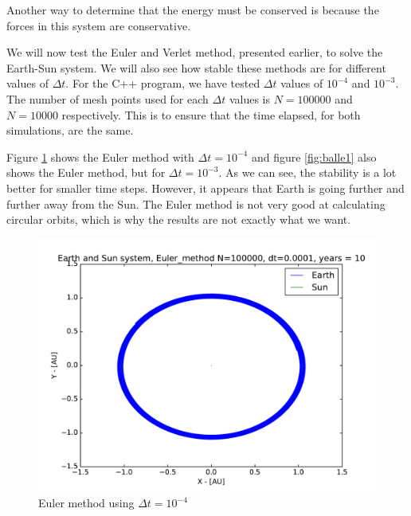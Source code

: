\documentclass[12pt]{article}
\begin{document}
Another way to determine that the energy must be conserved is because the forces in this system are conservative.


We will now test the Euler and Verlet method, presented earlier, to solve the Earth-Sun system. We will also see how stable these methods are for different values of $\Delta t$. For the C++ program, we have tested $\Delta t$ values of $10^{-4}$ and $10^{-3}$. The number of mesh points used for each $\Delta t$ values is $N = 100 000$ and $N=10 000$ respectively. This is to ensure that the time elapsed, for both simulations, are the same.

Figure \ref{fig:balle} shows the Euler method with $\Delta t = 10^{-4}$ and figure \ref{fig:balle1} also shows the Euler method, but for $\Delta t = 10^{-3}$. As we can see, the stability is a lot better for smaller time steps. However, it appears that Earth is going further and further away from the Sun. The Euler method is not very good at calculating circular orbits, which is why the results are not exactly what we want.

\begin{figure}[!h]
\centering
\includegraphics[width=\linewidth]{Plots/Earth_Sun_Euler_method.pdf}
\caption{Euler method using $\Delta t = 10^{-4}$}
\label{fig:balle}
\end{figure}
\end{document}
